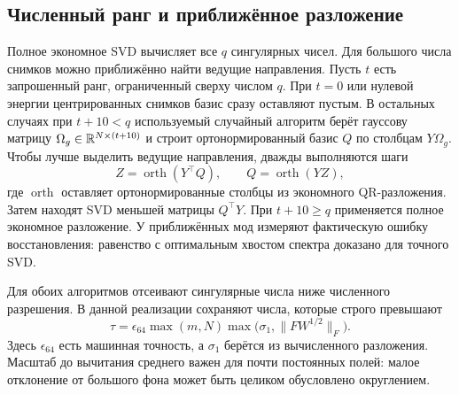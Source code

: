\subsection{Численный ранг и приближённое разложение}
Полное экономное SVD вычисляет все $q$ сингулярных чисел. Для большого
числа снимков можно приближённо найти ведущие направления. Пусть $t$
есть запрошенный ранг, ограниченный сверху числом $q$. При $t=0$ или
нулевой энергии центрированных снимков базис сразу оставляют пустым.
В остальных случаях при $t+10<q$
используемый случайный алгоритм берёт гауссову матрицу
$\Omega_g\in\mathbb{R}^{N\times(t+10)}$ и строит ортонормированный базис $Q$
по столбцам $Y\Omega_g$. Чтобы лучше выделить ведущие направления,
дважды выполняются шаги
\begin{equation}
 Z=\operatorname{orth}(Y^\top Q),\qquad
 Q=\operatorname{orth}(YZ),\label{math:power}
\end{equation}
где $\operatorname{orth}$ оставляет ортонормированные столбцы из
экономного QR-разложения. Затем находят SVD меньшей матрицы $Q^\top Y$.
При $t+10\ge q$ применяется полное экономное разложение.
У приближённых мод измеряют фактическую ошибку восстановления:
равенство с оптимальным хвостом спектра доказано для точного SVD.

Для обоих алгоритмов отсеивают сингулярные числа ниже численного
разрешения. В данной реализации сохраняют числа, которые строго
превышают
\begin{equation}
 \tau=\epsilon_{64}\max(m,N)\max\bigl(\sigma_1,\|FW^{1/2}\|_F\bigr).
 \label{math:numeric-threshold}
\end{equation}
Здесь $\epsilon_{64}$ есть машинная точность, а $\sigma_1$ берётся из
вычисленного разложения. Масштаб до вычитания среднего важен для почти
постоянных полей: малое отклонение от большого фона может быть целиком
обусловлено округлением.
